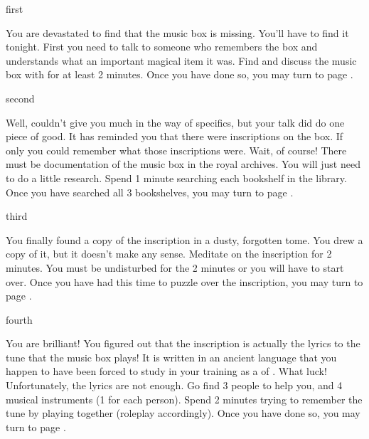 \documentclass[greennotebook]{NeptuneBall}
\begin{document}

\startnotebook{\nMusicBox{}}

\begin{page}{first}

You are devastated to find that the music box is missing. You'll have to find it tonight. First you need to talk to someone who remembers the box and understands what an important magical item it was. Find \cManta{} and discuss the music box with \cManta{\them} for at least 2 minutes. Once you have done so, you may turn to page .

\end{page}

\begin{page}{second}

Well, \cManta{} couldn't give you much in the way of specifics, but your talk did do one piece of good. It has reminded you that there were inscriptions on the box. If only you could remember what those inscriptions were. Wait, of course! There must be documentation of the music box in the royal archives. You will just need to do a little research. Spend 1 minute searching each bookshelf in the library. Once you have searched all 3 bookshelves, you may turn to page .

\end{page}

\begin{page}{third}

You finally found a copy of the inscription in a dusty, forgotten tome. You drew a copy of it, but it doesn't make any sense. Meditate on the inscription for 2 minutes. You must be undisturbed for the 2 minutes or you will have to start over. Once you have had this time to puzzle over the inscription, you may turn to page .

\end{page}

\begin{page}{fourth}

You are brilliant! You figured out that the inscription is actually the lyrics to the tune that the music box plays! It is written in an ancient language that you happen to have been forced to study in your training as a \cAriel{\prince} of \pAtlantis{}. What luck! Unfortunately, the lyrics are not enough. Go find 3 people to help you, and 4 musical  instruments (1 for each person). Spend 2 minutes trying to remember the tune by playing together (roleplay accordingly). Once you have done so, you may turn to page .

\end{page}
\end{document}
